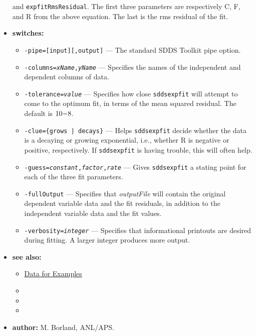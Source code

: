 \begin{itemize}
and {\tt expfitRmsResidual}.  The first three parameters are respectively C, F, and R from the above
equation.  The last is the rms residual of the fit.
\item {\bf switches:}
    \begin{itemize}
    \item {\tt -pipe=[input][,output]} --- The standard SDDS Toolkit pipe option.
    \item {\tt -columns={\em xName},{\em yName}} --- Specifies the names of the independent and dependent columns of data.
    \item {\tt -tolerance={\em value}} --- Specifies how close {\tt sddsexpfit} will attempt to come to the optimum fit,
        in terms of the mean squared residual.  The default is ${\rm 10 {-8}}$.
    \item {\tt -clue=\{grows | decays\}} --- Helps {\tt sddsexpfit} decide whether the data is a decaying or growing exponential,
        i.e., whether R is negative or positive, respectively.  If {\tt sddsexpfit} is having trouble, this
        will often help.
    \item {\tt -guess={\em constant},{\em factor},{\em rate}} --- Gives {\tt sddsexpfit} a stating point for each of the three fit parameters.
    \item {\tt -fullOutput} --- Specifies that {\em outputFile} will contain the original dependent variable
        data and the fit residuals, in addition to the independent variable data and the fit values.
    \item {\tt -verbosity={\em integer}} --- Specifies that informational printouts are desired during fitting.  A larger
        integer produces more output.
    \end{itemize}
\item {\bf see also:}
    \begin{itemize}
    \item \hyperref[exampleData]{Data for Examples}
    \item {}
    \item {}
    \item {}
    \end{itemize}
\item {\bf author:} M. Borland, ANL/APS.
\end{itemize}


